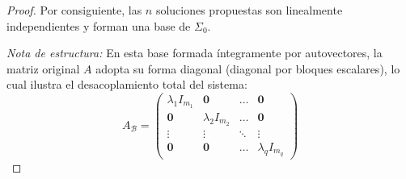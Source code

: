 \begin{proof}
    Por consiguiente, las $n$ soluciones propuestas son linealmente independientes y forman una base de $\Sigma_0$.
    
    \vspace{0.5cm}
    \textit{Nota de estructura:} En esta base formada íntegramente por autovectores, la matriz original $A$ adopta su forma diagonal (diagonal por bloques escalares), lo cual ilustra el desacoplamiento total del sistema:
    \[
        A_{\mathcal{B}} = \begin{pmatrix}
        \lambda_1 I_{m_1} & \mathbf{0} & \dots & \mathbf{0} \\
        \mathbf{0} & \lambda_2 I_{m_2} & \dots & \mathbf{0} \\
        \vdots & \vdots & \ddots & \vdots \\
        \mathbf{0} & \mathbf{0} & \dots & \lambda_q I_{m_q}
        \end{pmatrix}
    \]
\end{proof}
